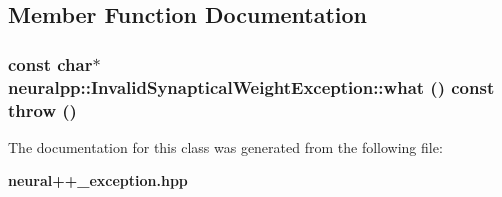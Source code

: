 \subsection{Member Function Documentation}
\subsubsection[what]{\setlength{\rightskip}{0pt plus 5cm}const char$\ast$ neuralpp::InvalidSynapticalWeightException::what () const  throw ()\hspace{0.3cm}{\tt  [inline]}}\label{classneuralpp_1_1InvalidSynapticalWeightException_8d374dd7e8363b2551ae6e306b11473a}




The documentation for this class was generated from the following file:\begin{CompactItemize}
\item 
{\bf neural++\_\-exception.hpp}\end{CompactItemize}
